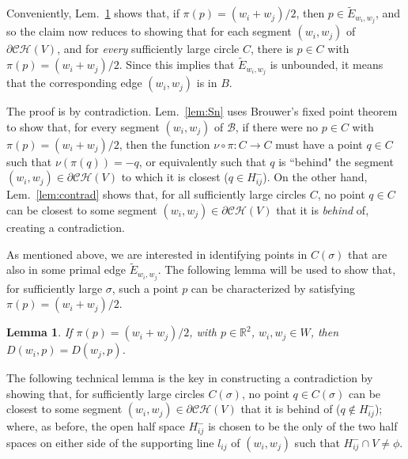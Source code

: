 \documentclass[11pt]{article}
\newtheorem{lemma}[theorem]{Lemma}
\begin{document}
Conveniently, Lem.~\ref{lem:mij} shows that, if $\pi(p)=(w_i+w_j)/2$, then
$p\in \tilde{E}_{w_i,w_j}$, and so the claim now reduces to showing that for each
segment $(w_i,w_j)$ of $\partial\mathcal{CH}(V)$, and for \emph{every} sufficiently large circle $C$, 
there is $p\in C$ with $\pi(p)=(w_i+w_j)/2$. Since this implies that $\tilde{E}_{w_i,w_j}$ is
unbounded, it means that the corresponding edge $(w_i,w_j)$ is in $B$. 

The proof is by contradiction. 
Lem.~\ref{lem:Sn} uses Brouwer's fixed point theorem to show that, for every segment $(w_i,w_j)$ of $\mathcal{B}$, 
if there were no $p\in C$ with $\pi(p)=(w_i+w_j)/2$, then 
the function $\nu\circ\pi:C\rightarrow C$ must have a point $q\in C$ such that
$\nu(\pi(q))=-q$, or equivalently such that 
$q$ is ``behind" the segment $(w_i,w_j)\in\partial\mathcal{CH}(V)$ to which it is
closest ($q\in H^{-}_{ij}$). 
On the other hand, Lem.~\ref{lem:contrad} shows that, for all sufficiently large circles $C$, no
point $q\in C$ can be closest to some segment
$(w_i,w_j)\in\partial\mathcal{CH}(V)$ that it is \emph{behind} of, creating a contradiction. 






As mentioned above, we are interested in identifying points in $C(\sigma)$
that are also in some primal edge $\tilde{E}_{w_i,w_j}$. The following lemma will be used
to show that, for sufficiently large $\sigma$, such a point $p$ can be
characterized by satisfying $\pi(p)=(w_i+w_j)/2$. 



\begin{lemma}\label{lem:mij}
	If $\pi(p)=(w_i+w_j)/2$, with $p\in\mathbb{R}^2$,  $w_i,w_j\in W$, then
$D(w_i,p) = D(w_j,p)$. 
\end{lemma}












The following technical lemma is the key in constructing a contradiction by showing that, 
for sufficiently large circles $C(\sigma)$, no
point $q\in C(\sigma)$ can be closest to some segment
$(w_i,w_j)\in\partial\mathcal{CH}(V)$ that it is behind of ($q\notin H^{-}_{ij}$); 
where, as before, the open half space $H^{-}_{ij}$ is chosen to be 
the only of the two half spaces on either side of the supporting line $l_{ij}$ of $(w_i,w_j)$ 
such that $H^{-}_{ij}\cap V\neq\phi$. 
\end{document}
